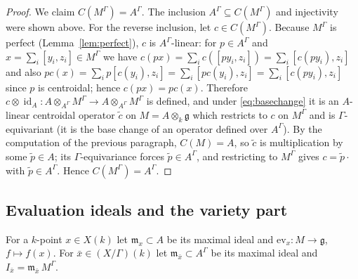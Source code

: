 \documentclass{amsart}
\theoremstyle{definition}
\DeclareMathOperator{\id}{id}
\newcommand{\g}{\mathfrak{g}}
\newcommand{\M}{M}
\begin{document}
\begin{proof}
We claim $C(\M^\Gamma)=A^\Gamma$.  The inclusion
$A^\Gamma\subseteq C(\M^\Gamma)$ and injectivity were shown above.  For the
reverse inclusion, let $c\in C(\M^\Gamma)$.  Because $\M^\Gamma$ is perfect
(Lemma~\ref{lem:perfect}), $c$ is $A^\Gamma$-linear: for $p\in A^\Gamma$
and $x=\sum_i[y_i,z_i]\in\M^\Gamma$ we have
$c(px)=\sum_i c([py_i,z_i])=\sum_i[c(py_i),z_i]$ and also
$pc(x)=\sum_i p[c(y_i),z_i]=\sum_i[pc(y_i),z_i]=\sum_i[c(py_i),z_i]$ since
$p$ is centroidal; hence $c(px)=pc(x)$.  Therefore
$c\otimes\id_A\colon A\otimes_{A^\Gamma}\M^\Gamma\to
A\otimes_{A^\Gamma}\M^\Gamma$ is defined, and under \eqref{eq:basechange}
it is an $A$-linear centroidal operator $\tilde c$ on $\M=A\otimes_k\g$
which restricts to $c$ on $\M^\Gamma$ and is $\Gamma$-equivariant (it is
the base change of an operator defined over $A^\Gamma$).  By the
computation of the previous paragraph, $C(\M)=A$, so $\tilde c$ is
multiplication by some $\tilde p\in A$; its $\Gamma$-equivariance forces
$\tilde p\in A^\Gamma$, and restricting to $\M^\Gamma$ gives
$c=\tilde p\cdot$ with $\tilde p\in A^\Gamma$.  Hence
$C(\M^\Gamma)=A^\Gamma$.
\end{proof}

\subsection{Evaluation ideals and the variety part}
For a $k$-point $x\in X(k)$ let $\mathfrak m_x\subset A$ be its maximal
ideal and $\mathrm{ev}_x\colon\M\to\g$, $f\mapsto f(x)$.  For
$\bar x\in (X/\Gamma)(k)$ let $\mathfrak m_{\bar x}\subset A^\Gamma$ be its
maximal ideal and $I_{\bar x}=\mathfrak m_{\bar x}\,\M^\Gamma$.
\end{document}
